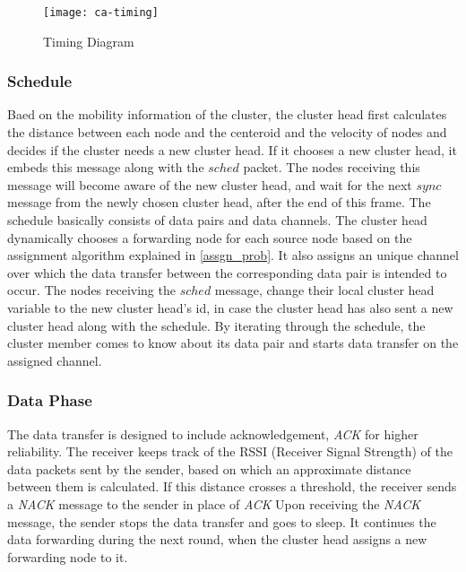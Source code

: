 \begin{figure}[h]{} 
  \begin{center}
		\texttt{[image: ca-timing]}
		\caption{Timing Diagram}
	\label{fig:ca-timing}
  \end{center}
\end{figure}


\subsubsection{Schedule}
Baed on the mobility information of the cluster, the cluster head first calculates the distance between each node and the centeroid and the velocity of nodes and decides if the cluster needs a new cluster head. If it chooses a new cluster head, it embeds this message along with the $sched$ packet.  The nodes receiving this message will become aware of the new cluster head, and wait for the next $sync$ message from the newly chosen cluster head, after the end of this frame. The schedule basically consists of data pairs and data channels. The cluster head dynamically chooses a forwarding node for each source node based on the assignment algorithm explained in \ref{assgn_prob}. It also assigns an unique channel over which the data transfer between the corresponding data pair is intended to occur. The nodes receiving the $sched$ message, change their local cluster head variable to the new cluster head's id, in case the cluster head has also sent a new cluster head along with the schedule. By iterating through the schedule, the cluster member comes to know about its data pair and starts data transfer on the assigned channel.

\subsubsection{Data Phase}
The data transfer is designed to include acknowledgement, \emph{ACK} for higher reliability. The receiver keeps track of the RSSI (Receiver Signal Strength) of the data packets sent by the sender, based on which an approximate distance between them is calculated. If this distance crosses a threshold, the receiver sends a \emph{NACK} message to the sender in place of \emph{ACK} Upon receiving the \emph{NACK} message, the sender stops the data transfer and goes to sleep. It continues the data forwarding during the next round, when the cluster head assigns a new forwarding node to it.\\

